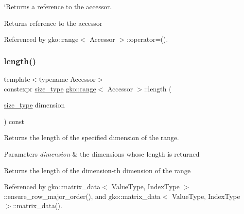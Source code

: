 `\+Returns a reference to the accessor. 

\begin{DoxyReturn}{Returns}
reference to the accessor 
\end{DoxyReturn}


Referenced by gko\+::range$<$ Accessor $>$\+::operator=().

\mbox{\label{classgko_1_1range_a3ac8b238c377da9cc05d7c728efabfc8}} 
\subsubsection{\texorpdfstring{length()}{length()}}
{\footnotesize\ttfamily template$<$typename Accessor$>$ \\
constexpr \hyperlink{namespacegko_a6e5c95df0ae4e47aab2f604a22d98ee7}{size\+\_\+type} \hyperlink{classgko_1_1range}{gko\+::range}$<$ Accessor $>$\+::length (\begin{DoxyParamCaption}\item[{\hyperlink{namespacegko_a6e5c95df0ae4e47aab2f604a22d98ee7}{size\+\_\+type}}]{dimension }\end{DoxyParamCaption}) const}



Returns the length of the specified dimension of the range. 


\begin{DoxyParams}{Parameters}
{\em dimension} & the dimensions whose length is returned\\
\hline
\end{DoxyParams}
\begin{DoxyReturn}{Returns}
the length of the {\ttfamily dimension}-\/th dimension of the range 
\end{DoxyReturn}


Referenced by gko\+::matrix\+\_\+data$<$ Value\+Type, Index\+Type $>$\+::ensure\+\_\+row\+\_\+major\+\_\+order(), and gko\+::matrix\+\_\+data$<$ Value\+Type, Index\+Type $>$\+::matrix\+\_\+data().

\mbox{\label{classgko_1_1range_a3ac230f10fa217dbb46475ea38243573}} 
